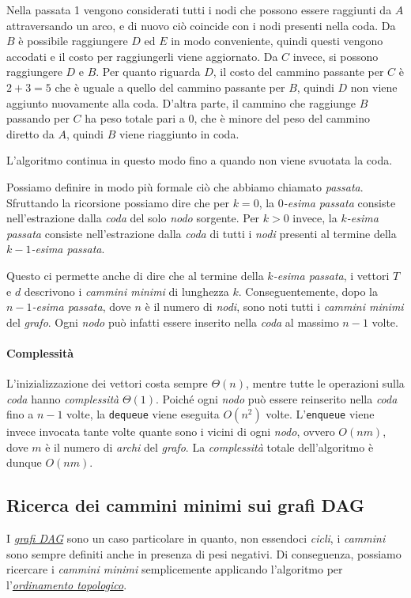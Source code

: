 \begin{eg}
Nella passata 1 vengono considerati tutti i nodi che possono essere raggiunti da
$A$ attraversando un arco, e di nuovo ciò coincide con i nodi presenti nella coda.
Da $B$ è possibile raggiungere $D$ ed $E$ in modo conveniente, quindi questi
vengono accodati e il costo per raggiungerli viene aggiornato. Da $C$ invece, si
possono raggiungere $D$ e $B$. Per quanto riguarda $D$, il costo del cammino
passante per $C$ è $2+3=5$ che è uguale a quello del cammino passante per $B$,
quindi $D$ non viene aggiunto nuovamente alla coda. D'altra parte, il cammino
che raggiunge $B$ passando per $C$ ha peso totale pari a 0, che è minore del
peso del cammino diretto da $A$, quindi $B$ viene riaggiunto in coda.

L'algoritmo continua in questo modo fino a quando non viene svuotata la coda.
\end{eg}

\noindent
Possiamo definire in modo più formale ciò che abbiamo chiamato \emph{passata}.
Sfruttando la ricorsione possiamo dire che per $k=0$, la \emph{$0$-esima passata}
consiste nell'estrazione dalla \emph{coda} del solo \emph{nodo} sorgente.
Per $k>0$ invece, la \emph{$k$-esima passata} consiste nell'estrazione dalla
\emph{coda} di tutti i \emph{nodi} presenti al termine della \emph{$k-1$-esima
passata}.

Questo ci permette anche di dire che al termine della \emph{$k$-esima passata},
i vettori $T$ e $d$ descrivono i \emph{cammini minimi} di lunghezza $k$.
Conseguentemente, dopo la \emph{$n-1$-esima passata}, dove $n$ è il
numero di \emph{nodi}, sono noti tutti i \emph{cammini minimi} del \emph{grafo}.
Ogni \emph{nodo} può infatti essere inserito nella \emph{coda} al massimo $n-1$
volte.

\paragraph{Complessità}
L'inizializzazione dei vettori costa sempre $\Theta(n)$, mentre tutte le
operazioni sulla \emph{coda} hanno \emph{complessità} $\Theta(1)$. Poiché ogni
\emph{nodo} può essere reinserito nella \emph{coda} fino a $n-1$ volte, la
\texttt{dequeue} viene eseguita $O(n^2)$ volte. L'\texttt{enqueue} viene invece
invocata tante volte quante sono i vicini di ogni \emph{nodo}, ovvero
$O(nm)$, dove $m$ è il numero di \emph{archi} del \emph{grafo}. La
\emph{complessità} totale dell'algoritmo è dunque $O(nm)$.

\subsection{Ricerca dei cammini minimi sui grafi DAG}
I \emph{\hyperref[def:79]{grafi DAG}} sono un caso particolare in quanto, non
essendoci \emph{cicli}, i \emph{cammini} sono sempre definiti anche in presenza
di pesi negativi. Di conseguenza, possiamo ricercare i \emph{cammini minimi}
semplicemente applicando l'algoritmo per l'\emph{\hyperref[def:83]{ordinamento
topologico}}.

